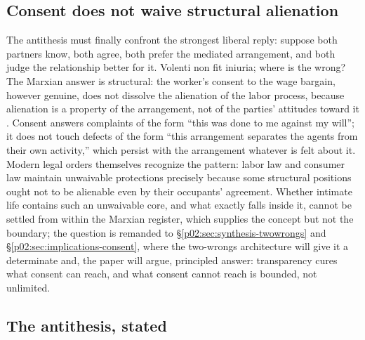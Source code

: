 \documentclass[11pt,a4paper]{article}
\begin{document}
\subsection{Consent does not waive structural alienation}
\label{p02:sec:marx-consent}

The antithesis must finally confront the strongest liberal reply: suppose both partners know, both agree, both prefer the mediated arrangement, and both judge the relationship better for it. Volenti non fit iniuria; where is the wrong? The Marxian answer is structural: the worker's consent to the wage bargain, however genuine, does not dissolve the alienation of the labor process, because alienation is a property of the arrangement, not of the parties' attitudes toward it \parencite{marx1844economic,jaeggi2014alienation}. Consent answers complaints of the form ``this was done to me against my will''; it does not touch defects of the form ``this arrangement separates the agents from their own activity,'' which persist with the arrangement whatever is felt about it. Modern legal orders themselves recognize the pattern: labor law and consumer law maintain unwaivable protections precisely because some structural positions ought not to be alienable even by their occupants' agreement. Whether intimate life contains such an unwaivable core, and what exactly falls inside it, cannot be settled from within the Marxian register, which supplies the concept but not the boundary; the question is remanded to \S\ref{p02:sec:synthesis-twowrongs} and \S\ref{p02:sec:implications-consent}, where the two-wrongs architecture will give it a determinate and, the paper will argue, principled answer: transparency cures what consent can reach, and what consent cannot reach is bounded, not unlimited.

\subsection{The antithesis, stated}
\label{p02:sec:marx-stated}
\end{document}
